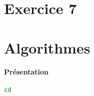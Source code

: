 \documentclass{article}
\begin{document}
\section{Exercice 7}



\section{Algorithmes}
\paragraph{Présentation}

\begin{scriptsize}\mycode
    \begin{lstlisting}[language=Bash]
    cd
    \end{lstlisting}
\end{scriptsize}
\end{document}
